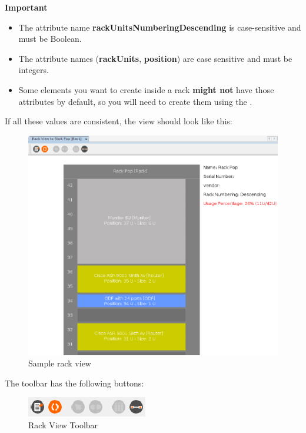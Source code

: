 \documentclass[a4paper]{article}
\begin{document}
		\newpage
		\begin{framed} {\large \textbf{Important}}
			\begin{itemize}
				\item The attribute name \textbf{rackUnitsNumberingDescending} is case-sensitive and must be Boolean.
				\item The attribute names (\textbf{rackUnits}, \textbf{position}) are case sensitive and must be integers.
				\item Some elements you want to create inside a rack \textbf{might not} have those attributes by default, so you will need to create them using the .			
			\end{itemize}
		\end{framed}
		\newpage		
		If all these values are consistent, the view should look like this:
		\begin{figure}[h!]
			\centering
			\includegraphics[width=0.85\linewidth]{img/rack_view_sample_view.png}
			\caption{Sample rack view}
			\label{fig:rack_view_sample_view}
		\end{figure}

		The toolbar has the following buttons:
		
		\begin{figure}[h!]
			\centering
			\includegraphics[width=0.3\linewidth]{img/rack_view_toolbar.png}
			\caption{Rack View Toolbar}
			\label{fig:rack_view_toolbar}
		\end{figure}
		
\end{document}
